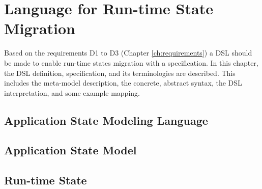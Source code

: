 \chapter{Language for Run-time State Migration}
\label{ch:language}
Based on the requirements D1 to D3 (Chapter \ref{ch:requirements}) a DSL should be made to enable run-time states migration with a specification.
In this chapter, the DSL definition, specification, and its terminologies are described. This includes the meta-model description, the concrete, abstract syntax, the DSL interpretation, and some example mapping.


\section{Application State Modeling Language}


\section{Application State Model}


\section{Run-time State}
